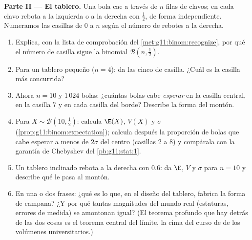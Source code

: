 \begin{problem}
\medskip
\noindent\textbf{Parte II --- El tablero.}
Una bola cae a través de $n$ filas de clavos; en cada clavo rebota a la
izquierda o a la derecha con  $\frac12$, de forma
independiente. Numeramos las casillas de $0$ a $n$ según el número de
rebotes a la derecha.
\begin{enumerate}[resume]
  \item Explica, con la lista de comprobación del
        \cref{met:g11:binom:recognize}, por qué el número de casilla sigue
        la  binomial $\mathcal B\!\left(n, \frac12\right)$.
  \item Para un tablero pequeño ($n = 4$): da las cinco  de
        casilla. ¿Cuál es la casilla más concurrida?
  \item Ahora $n = 10$ y $1\,024$ bolas: ¿cuántas bolas cabe
        \emph{esperar} en la casilla central, en la casilla $7$ y en cada
        casilla del borde? Describe la forma del montón.
  \item Para $X \sim \mathcal B\!\left(10, \frac12\right)$: calcula
        $\E(X)$, $V(X)$ y $\sigma$ (\cref{prop:g11:binom:expectation});
        calcula después la proporción de bolas que cabe esperar a menos de
        $2\sigma$ del centro (casillas $2$ a $8$) y compárala con la
        garantía de Chebyshev del \cref{pb:g11:stat:1}.
  \item Un tablero inclinado rebota a la derecha con  $0.6$:
        da $\E$, $V$ y $\sigma$ para $n = 10$ y describe qué le pasa al
        montón.
  \item En una o dos frases: ¿qué es lo que, en el diseño del tablero,
        fabrica la forma de campana? ¿Y por qué tantas magnitudes del
        mundo real (estaturas, errores de medida) se amontonan igual? (El
        teorema profundo que hay detrás de las dos cosas es el teorema
        central del límite, la cima del curso de  de los
        volúmenes universitarios.)
\end{enumerate}


\end{problem}
